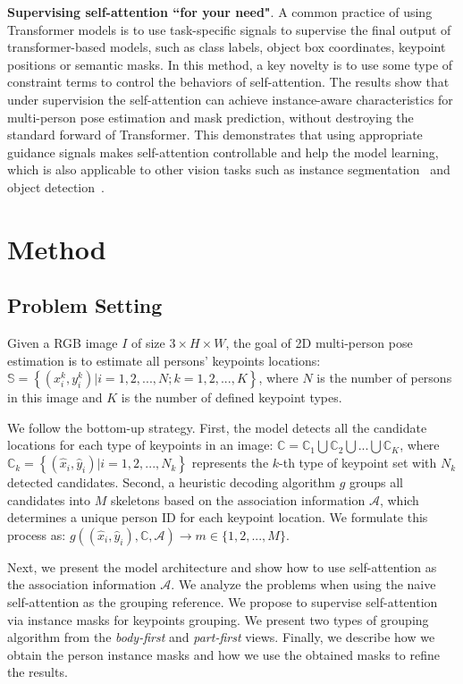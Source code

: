 \documentclass{article} \usepackage{iclr_conference,times}
\def\sC{{\mathbb{C}}}
\def\sS{{\mathbb{S}}}
\begin{document}
\textbf{Supervising self-attention ``for your need"}. A common practice of using Transformer models is to use task-specific signals to supervise the final output of transformer-based models, such as class labels, object box coordinates, keypoint positions or semantic masks. 
In this method, a key novelty is to use some type of constraint terms to control the behaviors of self-attention.  The results show that under supervision the self-attention can achieve instance-aware characteristics for multi-person pose estimation and mask prediction, without destroying the standard forward of Transformer. 
This demonstrates that using appropriate guidance signals makes self-attention controllable and help the model learning, which is also applicable to other vision tasks such as instance segmentation~\citep{vistr:wang2021end} and object detection~\citep{detr:carion2020detr}. 



\section{Method}



\subsection{Problem Setting}

Given a RGB image $I$ of size $3\times H \times W$, the goal of 2D multi-person pose estimation is to estimate all persons' keypoints locations: $\sS=\left\{(x_i^k,y_i^k)|i=1,2,...,N;k=1,2,...,K\right\}$, where $N$ is the number of persons in this image and $K$ is the number of defined keypoint types.

 We follow the bottom-up strategy. 
 First, the model detects all the candidate locations for each type of keypoints in an image: $\sC=\sC_1\bigcup \sC_2\bigcup...\bigcup \sC_K$, where $\sC_k=\left\{(\hat{x}_i,\hat{y}_i)|i=1,2,...,N_k\right\}$ represents the $k$-th type of keypoint set with $N_k$ detected candidates. Second, a heuristic decoding algorithm $g$ groups all candidates into $M$ skeletons based on the association information $\mathcal{A}$, which determines a unique person ID for each keypoint location. We formulate this process as: $g((\hat{x}_i,\hat{y}_i),\sC,\mathcal{A})\rightarrow m\in\{1,2,...,M\}$. 

Next, we present the model architecture and show how to use self-attention as the association information $\mathcal{A}$. We analyze the problems when using the naive self-attention as the grouping reference. 
We propose to supervise self-attention via instance masks for keypoints grouping.
We present two types of grouping algorithm from the \emph{body-first} and \emph{part-first} views. Finally, we describe how we obtain the person instance masks and how we use the obtained masks to refine the results.
\end{document}
